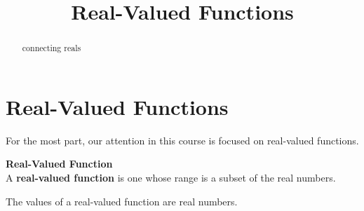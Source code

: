 \documentclass{ximera}
\title{Real-Valued Functions}
\begin{document}
\begin{abstract}
connecting reals
\end{abstract}
\maketitle




\section{Real-Valued Functions}

For the most part, our attention in this course is focused on real-valued functions.




\begin{definition} \textbf{\textcolor{green!50!black}{Real-Valued Function}} \\

A \textbf{real-valued function} is one whose range is a subset of the real numbers.

\end{definition}
The values of a real-valued function are real numbers.
\end{document}
